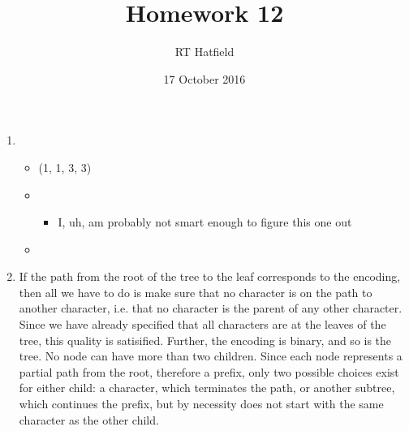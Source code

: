 \documentclass{article}
\title{Homework 12}
\author{RT Hatfield}
\date{17 October 2016}
\begin{document}
    \maketitle
    \begin{enumerate}
    \item \begin{itemize}
        \item (1, 1, 3, 3)
        \item \begin{itemize}
            \item I, uh, am probably not smart enough to figure this one out
        \end{itemize}
        \item
    \end{itemize}
    \item If the path from the root of the tree to the leaf corresponds to the encoding, then all we have to
    do is make sure that no character is on the path to another character, i.e. that no character is the 
    parent of any other character.  Since we have already specified that all characters are at the leaves of
    the tree, this quality is satisified.  Further, the encoding is binary, and so is the tree.  No node can
    have more than two children.  Since each node represents a partial path from the root, therefore a prefix,
    only two possible choices exist for either child: a character, which terminates the path, or another subtree,
    which continues the prefix, but by necessity does not start with the same character as the other child.
\end{enumerate}
\end{document}
